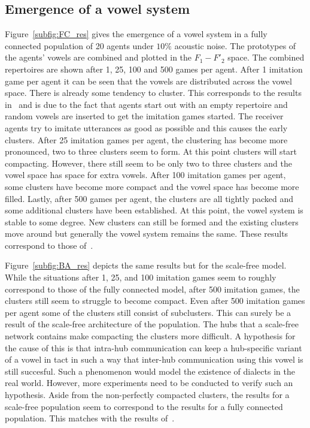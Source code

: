 \documentclass[11pt]{article}
\begin{document}
\subsection{Emergence of a vowel system}
Figure~\ref{subfig:FC_res} gives the emergence of a vowel system in a fully connected population of 20 agents under $10\%$ acoustic noise.
The prototypes of the agents' vowels are combined and plotted in the $F_1-F'_2$ space. The combined repertoires are shown after 1, 25, 100 and 500 games per agent.
After 1 imitation game per agent it can be seen that the vowels are distributed across the vowel space. There is already some tendency to cluster.
This corresponds to the results in~ and is due to the fact that agents start out with an empty repertoire and
random vowels are inserted to get the imitation games started. The receiver agents try to imitate utterances as good as possible and this causes the early clusters.
After 25 imitation games per agent, the clustering has become more pronounced, two to three clusters seem to form. At this point clusters will start compacting.
However, there still seem to be only two to three clusters and the vowel space has space for extra vowels.
After 100 imitation games per agent, some clusters have become more compact and the vowel space has become more filled.
Lastly, after 500 games per agent, the clusters are all tightly packed and some additional clusters have been established.
At this point, the vowel system is stable to some degree. New clusters can still be formed and the existing clusters move around but generally the vowel system remains the same.
These results correspond to those of~.

Figure~\ref{subfig:BA_res} depicts the same results but for the scale-free model.
While the situations after 1, 25, and 100 imitation games seem to roughly correspond to those of the fully connected model, after 500 imitation games, the clusters still seem
to struggle to become compact. Even after 500 imitation games per agent some of the clusters still consist of subclusters.
This can surely be a result of the scale-free architecture of the population.
The hubs that a scale-free network contains make compacting the clusters more difficult.
A hypothesis for the cause of this is that intra-hub communication can keep a hub-specific variant of a vowel in tact in such a way that inter-hub
communication using this vowel is still succesful. Such a phenomenon would model the existence of dialects in the real world.
However, more experiments need to be conducted to verify such an hypothesis.
Aside from the non-perfectly compacted clusters, the results for a scale-free population seem to correspond to the results for a fully connected population.
This matches with the results of~.
\end{document}
